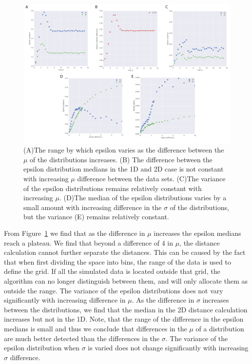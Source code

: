 \begin{figure}[htbp]
\centering
\includegraphics[scale=0.5]{chapterABCFlow/images/mus_sigmas_diff.png}
\caption[LoF caption]{ (A)The range by which epsilon varies as the difference between the $\mu$ of the distributions increases. (B) The difference between the epsilon distribution medians in the 1D and 2D case is not constant with increasing $\mu$ difference between the data sets. (C)The variance of the epsilon distributions remains relatively constant with increasing $\mu$. (D)The median of the epsilon distributions varies by a small amount with increasing difference in the $\sigma$ of the distributions, but the variance (E) remains relatively constant.}
\label{fig:epsilon_mu_s_diff}
\end{figure}
\clearpage



From Figure~\ref{fig:epsilon_mu_s_diff} we find that as the difference in $\mu$ increases the epsilon medians reach a plateau. We find that beyond a difference of 4 in $\mu$, the distance calculation cannot further separate the distances. This can be caused by the fact that when first dividing the space into bins, the range of the data is used to define the grid. If all the simulated data is located outside that grid, the algorithm can no longer distinguish between them, and will only allocate them as outside the range. The variance of the epsilon distributions does not vary significantly with increasing difference in $\mu$. As the difference in $\sigma$ increases between the distributions, we find that the median in the 2D distance calculation increases but not in the 1D. Note, that the range of the difference in the epsilon medians is small and thus we conclude that differences in the $\mu$ of a distribution are much better detected than the differences in the $\sigma$. The variance of the epsilon distribution when $\sigma$ is varied does not change significantly with increasing $\sigma$ difference.

